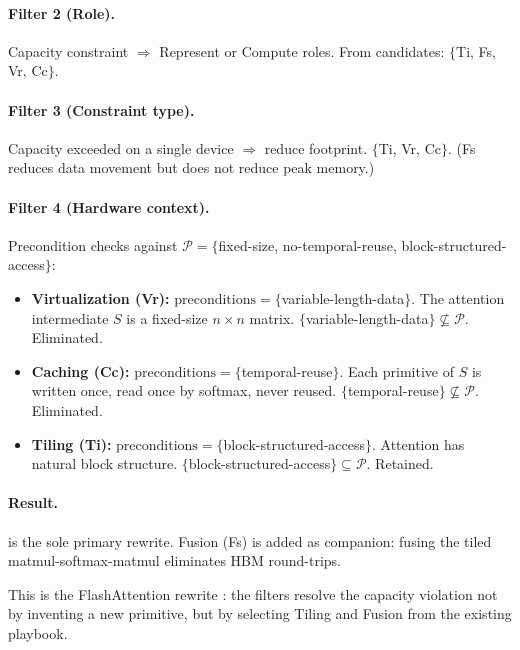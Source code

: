 \documentclass[10pt,twocolumn]{article}
\begin{document}
\paragraph{Filter 2 (Role).} Capacity constraint $\Rightarrow$ Represent or Compute roles. From candidates: $\{$Ti, Fs, Vr, Cc$\}$.

\paragraph{Filter 3 (Constraint type).} Capacity exceeded on a single device $\Rightarrow$ reduce footprint. $\{$Ti, Vr, Cc$\}$. (Fs reduces data movement but does not reduce peak memory.)

\paragraph{Filter 4 (Hardware context).} Precondition checks against $\mathcal{P} = \{$fixed-size, no-temporal-reuse, block-structured-access$\}$:

\begin{itemize}[nosep]
\item \textbf{Virtualization (Vr):} $\text{preconditions} = \{$variable-length-data$\}$. The attention intermediate $S$ is a fixed-size $n \times n$ matrix. $\{$variable-length-data$\} \not\subseteq \mathcal{P}$. Eliminated.

\item \textbf{Caching (Cc):} $\text{preconditions} = \{$temporal-reuse$\}$. Each primitive of $S$ is written once, read once by softmax, never reused. $\{$temporal-reuse$\} \not\subseteq \mathcal{P}$. Eliminated.

\item \textbf{Tiling (Ti):} $\text{preconditions} = \{$block-structured-access$\}$. Attention has natural block structure. $\{$block-structured-access$\} \subseteq \mathcal{P}$. Retained.
\end{itemize}

\paragraph{Result.}  is the sole primary rewrite. Fusion (Fs) is added as companion: fusing the tiled matmul-softmax-matmul eliminates HBM round-trips.

This is the FlashAttention rewrite \citep{dao2022}: the filters resolve the capacity violation not by inventing a new primitive, but by selecting Tiling and Fusion from the existing playbook.
\end{document}
